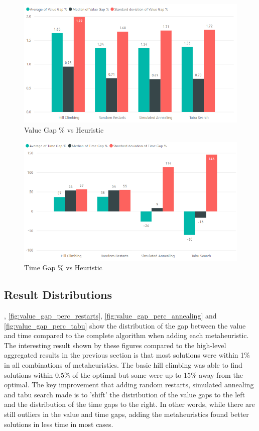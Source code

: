 \begin{figure}[h!]
    \centering
    \includegraphics[width=\textwidth]{Figures/Metaheuristics/value_gap_perc_vs_heuristic.png}
    \caption{Value Gap \% vs Heuristic}
    \label{fig:value_gap_perc_vs_heuristic}
\end{figure}

\begin{figure}[h!]
    \centering
    \includegraphics[width=\textwidth]{Figures/Metaheuristics/time_gap_perc_vs_heuristic.png}
    \caption{Time Gap \% vs Heuristic}
    \label{fig:time_gap_perc_vs_heuristic}
\end{figure}


\subsection{Result Distributions}
\label{subsec:result_distributions}

, \cref{fig:value_gap_perc_restarts}, \cref{fig:value_gap_perc_annealing} and \cref{fig:value_gap_perc_tabu} show the distribution of the gap between the value and time compared to the complete algorithm when adding each metaheuristic. The interesting result shown by these figures compared to the high-level aggregated results in the previous section is that most solutions were within 1\% in all combinations of metaheuristics. The basic hill climbing was able to find solutions within 0.5\% of the optimal but some were up to 15\% away from the optimal. The key improvement that adding random restarts, simulated annealing and tabu search made is to 'shift' the distribution of the value gaps to the left and the distribution of the time gaps to the right. In other words, while there are still outliers in the value and time gaps, adding the metaheuristics found better solutions in less time in most cases.

